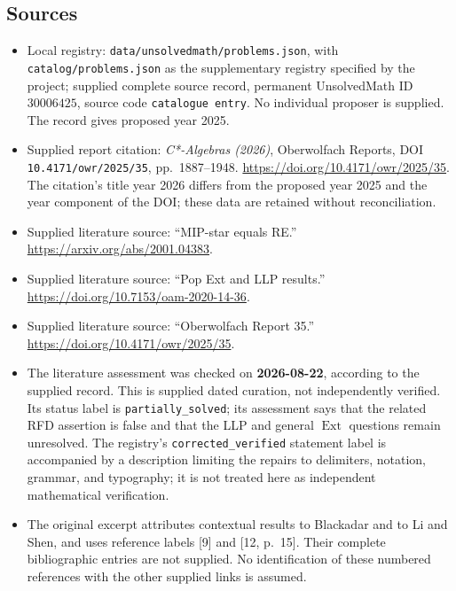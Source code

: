 \documentclass[11pt]{article}
\begin{document}
\subsection{Sources}
\begin{itemize}
\item Local registry: \texttt{data/unsolvedmath/problems.json}, with \texttt{catalog/problems.json} as the supplementary registry specified by the project; supplied complete source record, permanent UnsolvedMath ID \(30006425\), source code \texttt{catalogue entry}. No individual proposer is supplied. The record gives proposed year 2025.
\item Supplied report citation: \emph{C*-Algebras (2026)}, Oberwolfach Reports, DOI \texttt{10.4171/owr/2025/35}, pp.~1887--1948. \url{https://doi.org/10.4171/owr/2025/35}. The citation's title year 2026 differs from the proposed year 2025 and the year component of the DOI; these data are retained without reconciliation.
\item Supplied literature source: ``MIP-star equals RE.'' \url{https://arxiv.org/abs/2001.04383}.
\item Supplied literature source: ``Pop Ext and LLP results.'' \url{https://doi.org/10.7153/oam-2020-14-36}.
\item Supplied literature source: ``Oberwolfach Report 35.'' \url{https://doi.org/10.4171/owr/2025/35}.
\item The literature assessment was checked on \textbf{2026-08-22}, according to the supplied record. This is supplied dated curation, not independently verified. Its status label is \texttt{partially\_solved}; its assessment says that the related RFD assertion is false and that the LLP and general \(\operatorname{Ext}\) questions remain unresolved. The registry's \texttt{corrected\_verified} statement label is accompanied by a description limiting the repairs to delimiters, notation, grammar, and typography; it is not treated here as independent mathematical verification.
\item The original excerpt attributes contextual results to Blackadar and to Li and Shen, and uses reference labels [9] and [12, p.~15]. Their complete bibliographic entries are not supplied. No identification of these numbered references with the other supplied links is assumed.
\end{itemize}
\end{document}
